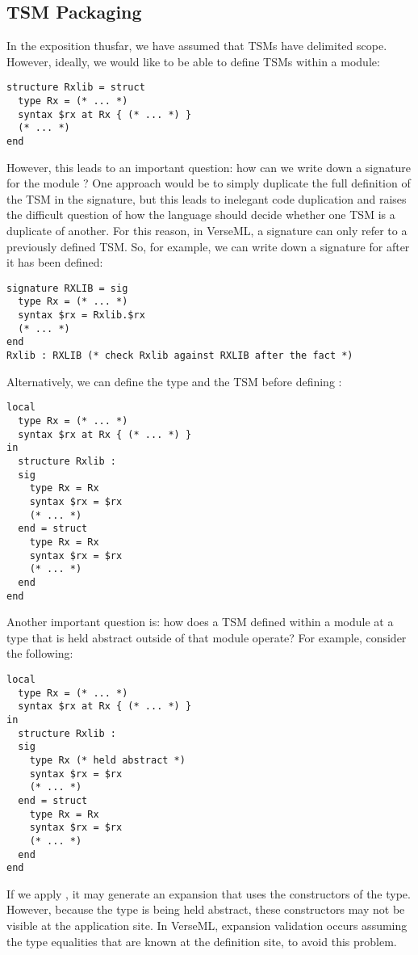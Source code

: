 {\subsection{TSM Packaging}\label{sec:tsm-packaging}

In the exposition thusfar, we have assumed that TSMs have delimited scope. However, ideally, we would like to be able to define TSMs within a module:
\begin{lstlisting}[numbers=none]
structure Rxlib = struct 
  type Rx = (* ... *)
  syntax $rx at Rx { (* ... *) }
  (* ... *)
end
\end{lstlisting}
However, this leads to an important question: how can we write down a signature for the module ? One approach would be to simply duplicate the full definition of the TSM in the signature, but this leads to inelegant code duplication and raises the difficult question of how the language should decide whether one TSM is a duplicate of another. For this reason, in VerseML, a signature can only refer to a previously defined TSM. So, for example, we can write down a signature for  after it has been defined:

\begin{lstlisting}[numbers=none]
signature RXLIB = sig 
  type Rx = (* ... *)
  syntax $rx = Rxlib.$rx
  (* ... *)
end
Rxlib : RXLIB (* check Rxlib against RXLIB after the fact *)
\end{lstlisting}

Alternatively, we can define the type  and the TSM  before defining :
\begin{lstlisting}[numbers=none]
local 
  type Rx = (* ... *)
  syntax $rx at Rx { (* ... *) }
in 
  structure Rxlib : 
  sig 
    type Rx = Rx
    syntax $rx = $rx
    (* ... *)
  end = struct 
    type Rx = Rx 
    syntax $rx = $rx
    (* ... *)
  end
end 
\end{lstlisting}

Another important question is: how does a TSM defined within a module at a type that is held abstract outside of that module operate? For example, consider the following:
\begin{lstlisting}[numbers=none]
local 
  type Rx = (* ... *)
  syntax $rx at Rx { (* ... *) }
in 
  structure Rxlib : 
  sig 
    type Rx (* held abstract *)
    syntax $rx = $rx
    (* ... *)
  end = struct 
    type Rx = Rx
    syntax $rx = $rx
    (* ... *)
  end
end 
\end{lstlisting}
If we apply , it may generate an expansion that uses the constructors of the  type. However, because the type is being held abstract, these constructors may not be visible at the application site. In VerseML, expansion validation occurs assuming the type equalities that are known at the definition site, to avoid this problem.  

}
